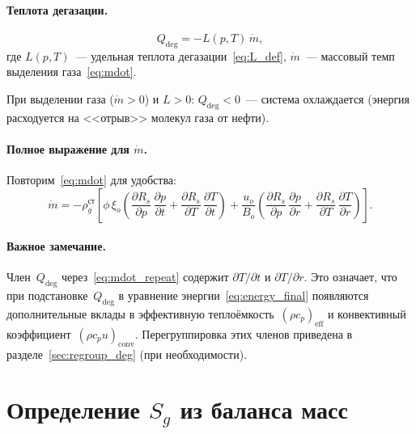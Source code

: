 \documentclass[12pt,a4paper]{article}
\begin{document}
\paragraph{Теплота дегазации.}
\begin{equation}\label{eq:Qdeg}
  \boxed{
    Q_{\mathrm{deg}} = -L(p,T)\,\dot{m},
  }
\end{equation}
где $L(p,T)$~--- удельная теплота дегазации~\eqref{eq:L_def},
$\dot{m}$~--- массовый темп выделения газа~\eqref{eq:mdot}.

При выделении газа ($\dot{m} > 0$) и $L > 0$: $Q_{\mathrm{deg}} < 0$~---
система охлаждается (энергия расходуется на <<отрыв>> молекул газа от
нефти).

\paragraph{Полное выражение для $\dot{m}$.}
Повторим~\eqref{eq:mdot} для удобства:
\begin{equation}\label{eq:mdot_repeat}
  \dot{m} = -\rho_g^{\text{ст}}\!\left[
    \phi\,\xi_o\!\left(
      \frac{\partial R_s}{\partial p}\,\frac{\partial p}{\partial t}
      + \frac{\partial R_s}{\partial T}\,\frac{\partial T}{\partial t}
    \right)
    + \frac{u_o}{B_o}\!\left(
      \frac{\partial R_s}{\partial p}\,\frac{\partial p}{\partial r}
      + \frac{\partial R_s}{\partial T}\,\frac{\partial T}{\partial r}
    \right)
  \right].
\end{equation}

\paragraph{Важное замечание.}
Член~$Q_{\mathrm{deg}}$ через~\eqref{eq:mdot_repeat} содержит
$\partial T/\partial t$ и $\partial T/\partial r$. Это означает, что
при подстановке~$Q_{\mathrm{deg}}$ в уравнение
энергии~\eqref{eq:energy_final} появляются дополнительные вклады
в эффективную теплоёмкость~$(\rho c_p)_{\mathrm{eff}}$ и конвективный
коэффициент~$(\rho c_p u)_{\mathrm{conv}}$. Перегруппировка этих
членов приведена в разделе~\ref{sec:regroup_deg} (при необходимости).


\section{Определение $S_g$ из баланса масс}\label{sec:Sg}
\end{document}
